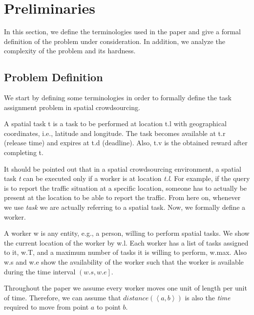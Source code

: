 \section{Preliminaries}
\label{sec:prelim}

In this section, we define the terminologies used in the paper and give a formal definition of the problem under consideration. In addition, we analyze the complexity of the problem and its hardness.

\subsection{Problem Definition}
\label{subsec:problemdef}

We start by defining some terminologies in order to formally define the task assignment problem in spatial crowdsourcing.

\begin{definition} 
A spatial task t is a task to be performed at location t.l with geographical coordinates, i.e., latitude and longitude. The task becomes available at t.r (release time) and expires at t.d (deadline). Also, t.v is the obtained reward after completing t.
\end{definition}

It should be pointed out that in a spatial crowdsourcing environment, a spatial task \emph{t} can be executed only if a worker is at location \emph{t.l}. For example, if the query is to report the traffic situation at a specific location, someone has to actually be present at the location to be able to report the traffic. From here on, whenever we use \emph{task} we are actually referring to a spatial task. Now, we formally define a worker.

\begin{definition} [Worker]
A worker w is any entity, e.g., a person, willing to perform spatial tasks. We show the current location of the worker by w.l. Each worker has a list of tasks assigned to it, w.T, and a maximum number of tasks it is willing to perform, w.max. Also w.s and w.e show the availability of the worker such that the worker is available during the time interval $\left( w.s, w.e \right]$.
\end{definition}

Throughout the paper we assume every worker moves one unit of length per unit of time. Therefore, we can assume that $distance \left( \left\langle a,b \right\rangle \right)$ is also the \emph{time} required to move from point $a$ to point $b$.

